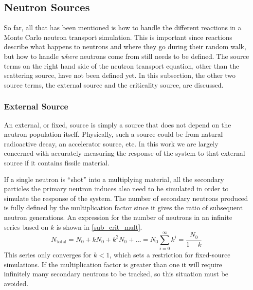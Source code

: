 \subsection{Neutron Sources}

So far, all that has been mentioned is how to handle the different reactions in a Monte Carlo neutron transport simulation.  This is important since reactions describe what happens to neutrons and where they go during their random walk, but how to handle \emph{where} neutrons come from still needs to be defined.  The source terms on the right hand side of the neutron transport equation, other than the scattering source, have not been defined yet.  In this subsection, the other two source terms, the external source and the criticality source, are discussed.

\subsubsection{External Source}

An external, or fixed, source is simply a source that does not depend on the neutron population itself.  Physically, such a source could be from natural radioactive decay, an accelerator source, etc.  In this work we are largely concerned with accurately measuring the response of the system to that external source if it contains fissile material.

If a single neutron is ``shot'' into a multiplying material, all the secondary particles the primary neutron induces also need to be simulated in order to simulate the response of the system.  The number of secondary neutrons produced is fully defined by the multiplication factor since it gives the ratio of subsequent neutron generations.  An expression for the number of neutrons in an infinite series based on $k$ is shown in \eqref{sub_crit_mult}\cite{duderstadt}\cite{jaakko}.
%
\begin{equation}
\label{sub_crit_mult}
N_\mathrm{total} = N_0 + k N_0 + k^2 N_0 + \dots = N_0 \sum_{i=0}^\infty k^i = \frac{N_0}{1-k}
\end{equation}
%
This series only converges for $k<1$, which sets a restriction for fixed-source simulations.  If the multiplication factor is greater than one it will require infinitely many secondary neutrons to be tracked, so this situation must be avoided.

